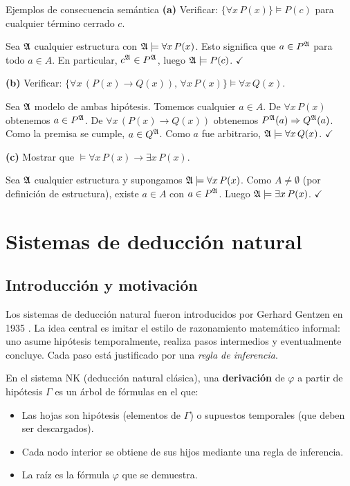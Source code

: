 \begin{ejemplo}{Ejemplos de consecuencia semántica}{}
\textbf{(a)} Verificar: $\{\forall x\, P(x)\} \models P(c)$ para cualquier término cerrado $c$.

Sea $\mathfrak{A}$ cualquier estructura con $\mathfrak{A} \models \forall x\, P(x)$. Esto significa que $a \in P^{\mathfrak{A}}$ para todo $a \in A$. En particular, $c^{\mathfrak{A}} \in P^{\mathfrak{A}}$, luego $\mathfrak{A} \models P(c)$. $\checkmark$

\medskip
\textbf{(b)} Verificar: $\{\forall x\,(P(x) \to Q(x)),\, \forall x\, P(x)\} \models \forall x\, Q(x)$.

Sea $\mathfrak{A}$ modelo de ambas hipótesis. Tomemos cualquier $a \in A$. De $\forall x\, P(x)$ obtenemos $a \in P^{\mathfrak{A}}$. De $\forall x\,(P(x)\to Q(x))$ obtenemos $P^{\mathfrak{A}}(a) \Rightarrow Q^{\mathfrak{A}}(a)$. Como la premisa se cumple, $a \in Q^{\mathfrak{A}}$. Como $a$ fue arbitrario, $\mathfrak{A} \models \forall x\, Q(x)$. $\checkmark$

\medskip
\textbf{(c)} Mostrar que $\models \forall x\, P(x) \to \exists x\, P(x)$.

Sea $\mathfrak{A}$ cualquier estructura y supongamos $\mathfrak{A} \models \forall x\, P(x)$. Como $A \neq \emptyset$ (por definición de estructura), existe $a \in A$ con $a \in P^{\mathfrak{A}}$. Luego $\mathfrak{A} \models \exists x\, P(x)$. $\checkmark$
\end{ejemplo}

\section{Sistemas de deducción natural}

\subsection{Introducción y motivación}

Los sistemas de deducción natural fueron introducidos por Gerhard Gentzen en 1935 \cite{vandalen2013}. La idea central es imitar el estilo de razonamiento matemático informal: uno asume hipótesis temporalmente, realiza pasos intermedios y eventualmente concluye. Cada paso está justificado por una \emph{regla de inferencia}.

En el sistema NK (deducción natural clásica), una \textbf{derivación} de $\varphi$ a partir de hipótesis $\Gamma$ es un árbol de fórmulas en el que:
\begin{itemize}
  \item Las hojas son hipótesis (elementos de $\Gamma$) o supuestos temporales (que deben ser descargados).
  \item Cada nodo interior se obtiene de sus hijos mediante una regla de inferencia.
  \item La raíz es la fórmula $\varphi$ que se demuestra.
\end{itemize}

